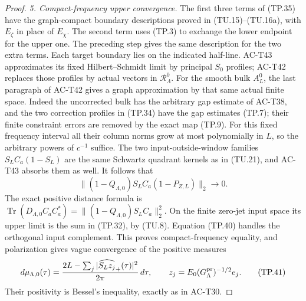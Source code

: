 \begin{proof}
\emph{5. Compact-frequency upper convergence.}
The first three terms of (TP.35) have the
graph-compact boundary descriptions proved in
(TU.15)--(TU.16a), with \(E_\zeta\) in place of
\(E_\chi\).  The second term uses (TP.3) to
exchange the lower endpoint for the upper one.
The preceding step gives the same description
for the two extra terms.
Each target boundary lies on the indicated
half-line.  AC-T43 approximates its fixed
Hilbert--Schmidt limit by principal \(S_0\)
profiles; AC-T42 replaces those profiles by
actual vectors in \(\mathcal R_\Lambda^0\).
For the smooth bulk \(A_L^0\), the last paragraph
of AC-T42 gives a graph approximation by that
same actual finite space.
Indeed the uncorrected bulk has the arbitrary
gap estimate of AC-T38, and the two correction
profiles in (TP.34) have the gap estimates
(TP.7); their finite constraint errors are
removed by the exact map (TP.9).
For this fixed frequency interval all their
column norms grow at most polynomially in \(L\),
so the arbitrary powers of \(c^{-1}\) suffice.
The two input-outside-window families
\(S_LC_a(1-S_L)\) are the same Schwartz quadrant
kernels as in (TU.21), and AC-T43 absorbs
them as well.
It follows that
\[
       \|(1-Q_{\Lambda,0})S_LC_a(1-P_{Z,L})\|_2
                                          \longrightarrow0 .
 \tag{TP.40}
\]
The exact positive distance formula is
\(\operatorname{Tr}(D_{\Lambda,0}C_aC_a^*)
 =\|(1-Q_{\Lambda,0})S_LC_a\|_2^2\).
On the finite zero-jet input space its upper
limit is the sum in (TP.32), by (TU.8).
Equation (TP.40) handles the orthogonal input
complement.  This proves compact-frequency
equality, and polarization gives vague
convergence of the positive measures
\[
 d\mu_{\Lambda,0}(\tau)
   =\frac{2L-\sum_j|\widehat{S_Lz_j}_+(\tau)|^2}{2\pi}\,d\tau,
 \qquad z_j=E_0(G_\Lambda^{\rm pr})^{-1/2}e_j .
 \tag{TP.41}
\]
Their positivity is Bessel's inequality, exactly
as in AC-T30.


\end{proof}
